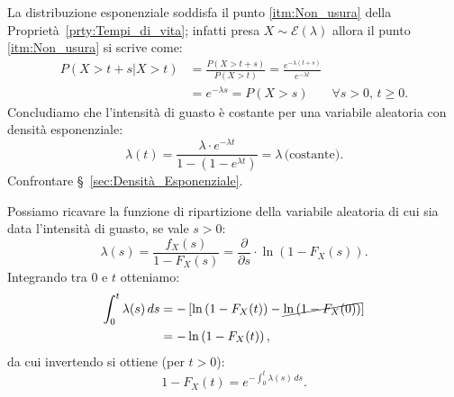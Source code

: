         \begin{prty}
            La distribuzione esponenziale soddisfa il punto \eqref{itm:Non_usura} della Proprietà~\ref{prty:Tempi_di_vita}; infatti presa $X \sim \mathcal{E}(\lambda)$ allora il punto \eqref{itm:Non_usura} si scrive come:
            \begin{align*}
                P(X > t + s | X > t) 
                &= \frac{P(X > t + s)}{P(X > t)}
                = \frac{e^{-\lambda(t+s)}}{e^{-\lambda t}} \\
                &= e^{-\lambda s} = P(X > s) & \forall s > 0,\, t \geq 0
            .\end{align*}
            Concludiamo che l'intensità di guasto è costante per una variabile aleatoria con densità esponenziale: \[
                \lambda(t) = \frac{\lambda \cdot e^{-\lambda t}}{1 - (1 - e^{\lambda t})} = \lambda\,\text{(costante)}
            .\] Confrontare §~\ref{sec:Densità_Esponenziale}.
        \end{prty}
        \begin{obsv}
            Possiamo ricavare la funzione di ripartizione della variabile aleatoria di cui sia data l'intensità di guasto, se vale $s > 0$: \[
                \lambda(s) = \frac{f_X(s)}{1 - F_X(s)} = \frac{\partial}{\partial s}\cdot \ln \left(1 - F_X(s)\right)
            .\] Integrando tra 0 e $t$ otteniamo:
            \begin{align*}
                \int_{0}^{t} \lambda(s)\, ds
                &= -\left[\ln \left(1 - F_X(t)\right) - \cancel{\ln \left(1 - F_X(0)\right)}\right] \\
                &= - \ln \left(1 - F_X(t)\right)
            ,\end{align*}
            da cui invertendo si ottiene (per $t > 0$): \[
                1 - F_X(t) = e^{- \int_{0}^{t} \lambda(s)\, ds}
            .\]
        \end{obsv}
